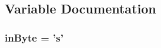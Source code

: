 \subsection{Variable Documentation}
\hypertarget{OWSearch_8ino_a62cd173143ff9c15a38fd17ab56970c9}{
\subsubsection[{in\-Byte}]{ in\-Byte = 's'}}\label{OWSearch_8ino_a62cd173143ff9c15a38fd17ab56970c9}
